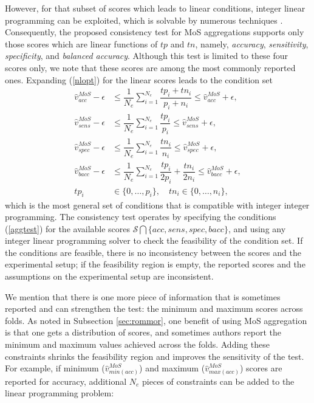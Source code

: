\documentclass[3p, times]{elsarticle}
\begin{document}
However, for that subset of scores which leads to linear conditions, integer linear programming can be exploited, which is solvable by numerous techniques \cite{ip}. Consequently, the proposed consistency test for MoS aggregations supports only those scores which are linear functions of $tp$ and $tn$, namely, \emph{accuracy}, \emph{sensitivity}, \emph{specificity}, and \emph{balanced accuracy}. Although this test is limited to these four scores only, we note that these scores are among the most commonly reported ones. 
Expanding (\ref{nlopt}) for the linear scores leads to the condition set
\begin{align}
\label{aggtest}
\hat{v}_{acc}^{MoS} - \epsilon & \leq \dfrac{1}{N_e} \sum\limits_{i=1}^{N_e} \dfrac{tp_i + tn_i}{p_i + n_i} \leq \hat{v}_{acc}^{MoS} + \epsilon, \nonumber \\
\hat{v}_{sens}^{MoS} - \epsilon & \leq \dfrac{1}{N_e} \sum\limits_{i=1}^{N_e} \dfrac{tp_i}{p_i} \leq \hat{v}_{sens}^{MoS} + \epsilon, \nonumber \\
\hat{v}_{spec}^{MoS} - \epsilon & \leq \dfrac{1}{N_e} \sum\limits_{i=1}^{N_e} \dfrac{tn_i}{n_i} \leq \hat{v}_{spec}^{MoS} + \epsilon, \nonumber \\
\hat{v}_{bacc}^{MoS} - \epsilon & \leq \dfrac{1}{N_e} \sum\limits_{i=1}^{N_e} \dfrac{tp_i}{2p_i} + \dfrac{tn_i}{2n_i} \leq \hat{v}_{bacc}^{MoS} + \epsilon, \nonumber \\
tp_i &\in \lbrace 0, \dots, p_i\rbrace, \quad tn_i \in \lbrace 0, \dots, n_i\rbrace,
\end{align}
which is the most general set of conditions that is compatible with integer integer programming. The consistency test operates by specifying the conditions (\ref{aggtest}) for the available scores $\mathcal{S} \bigcap \lbrace acc, sens, spec, bacc\rbrace$, and using any integer linear programming solver to check the feasibility of the condition set. If the conditions are feasible, there is no inconsistency between the scores and the experimental setup; if the feasibility region is empty, the reported scores and the assumptions on the experimental setup are inconsistent.

We mention that there is one more piece of information that is sometimes reported and can strengthen the test: the minimum and maximum scores across folds. As noted in Subsection \ref{sec:rommor}, one benefit of using MoS aggregation is that one gets a distribution of scores, and sometimes authors report the minimum and maximum values achieved across the folds. Adding these constraints shrinks the feasibility region and improves the sensitivity of the test. For example, if minimum ($\hat{v}_{min(acc)}^{MoS}$)  and maximum ($\hat{v}_{max(acc)}^{MoS}$) scores are reported for accuracy, additional $N_e$ pieces of constraints can be added to the linear programming problem:
\end{document}
